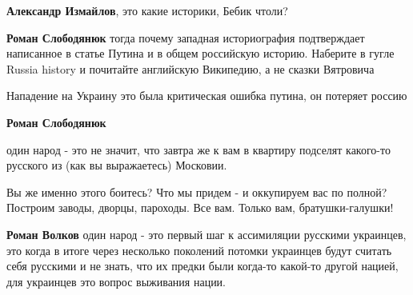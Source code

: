 \begin{itemize}
\begin{itemize}
 
\textbf{Александр Измайлов}, это какие историки, Бебик чтоли?

 
\textbf{Роман Слободянюк} тогда почему западная историография подтверждает написанное в статье Путина и в общем российскую историю. Наберите в гугле Russia history и почитайте английскую Википедию, а не сказки Вятровича

 
Нападение на Украину это была критическая ошибка путина, он потеряет россию

 
\textbf{Роман Слободянюк} 

один народ - это не значит, что завтра же к вам в квартиру подселят какого-то
русского из (как вы выражаетесь) Московии.

Вы же именно этого боитесь? Что мы придем - и оккупируем вас по полной?
Построим заводы, дворцы, пароходы. Все вам. Только вам, братушки-галушки!

 
\textbf{Роман Волков} один народ - это первый шаг к ассимиляции русскими украинцев, это когда в итоге через несколько поколений потомки украинцев будут считать себя русскими и не знать, что их предки были когда-то какой-то другой нацией, для украинцев это вопрос выживания нации.

 

\end{itemize}
\end{itemize}
